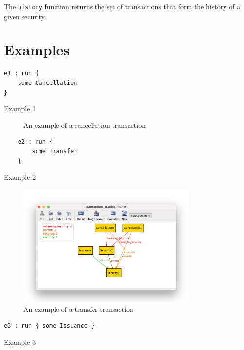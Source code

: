 The \texttt{history} function returns the set of transactions that form the history of a given security.

\section{Examples}

\begin{listing}[!h]
\begin{verbatim}
e1 : run {
    some Cancellation
}
\end{verbatim}
\caption{Example 1}
\label{lst:example-1}
\end{listing}


\begin{figure}[ht]
\centering
\caption{An example of a cancellation transaction}
\label{fig:transaction-tracing-for-stocks-example-1}
\end{figure}

\begin{listing}[!h]
\begin{verbatim}
	e2 : run {
		some Transfer
	}
\end{verbatim}
\caption{Example 2}
\label{lst:example-2}
\end{listing}


\begin{figure}[ht]
\centering
	\includegraphics[width=0.8\textwidth]{pics/cancellation.png}
\caption{An example of a transfer transaction}
\label{fig:transaction-tracing-for-stocks-example-2}
\end{figure}

\begin{listing}[!h]
\begin{verbatim}
e3 : run { some Issuance }
\end{verbatim}
\caption{Example 3}
\label{lst:example-3}
\end{listing}


